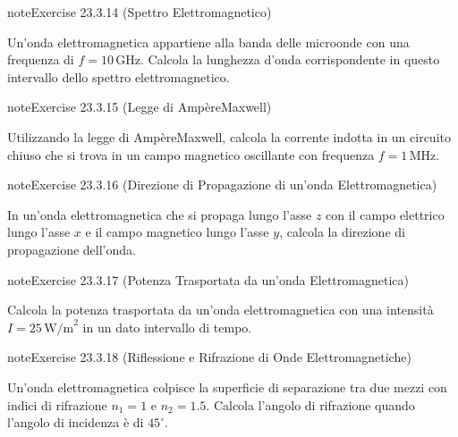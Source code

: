 \documentclass[letterpaper,10pt,italian]{jupyterBook}
\begin{document}
\begin{sphinxadmonition}{note}{Exercise 23.3.14 (Spettro Elettromagnetico)}



\sphinxAtStartPar
Un’onda elettromagnetica appartiene alla banda delle microonde con una frequenza di \(f = 10 \, \text{GHz}\). Calcola la lunghezza d’onda corrispondente in questo intervallo dello spettro elettromagnetico.
\end{sphinxadmonition}
 \label{exercise:ch/electromagnetism/em-waves-problems-exercise-14}

\begin{sphinxadmonition}{note}{Exercise 23.3.15 (Legge di Ampère\sphinxhyphen{}Maxwell)}



\sphinxAtStartPar
Utilizzando la legge di Ampère\sphinxhyphen{}Maxwell, calcola la corrente indotta in un circuito chiuso che si trova in un campo magnetico oscillante con frequenza \(f = 1 \, \text{MHz}\).
\end{sphinxadmonition}
 \label{exercise:ch/electromagnetism/em-waves-problems-exercise-15}

\begin{sphinxadmonition}{note}{Exercise 23.3.16 (Direzione di Propagazione di un’onda Elettromagnetica)}



\sphinxAtStartPar
In un’onda elettromagnetica che si propaga lungo l’asse \(z\) con il campo elettrico lungo l’asse \(x\) e il campo magnetico lungo l’asse \(y\), calcola la direzione di propagazione dell’onda.
\end{sphinxadmonition}
 \label{exercise:ch/electromagnetism/em-waves-problems-exercise-16}

\begin{sphinxadmonition}{note}{Exercise 23.3.17 (Potenza Trasportata da un’onda Elettromagnetica)}



\sphinxAtStartPar
Calcola la potenza trasportata da un’onda elettromagnetica con una intensità \(I = 25 \, \text{W/m}^2\) in un dato intervallo di tempo.
\end{sphinxadmonition}
 \label{exercise:ch/electromagnetism/em-waves-problems-exercise-17}

\begin{sphinxadmonition}{note}{Exercise 23.3.18 (Riflessione e Rifrazione di Onde Elettromagnetiche)}



\sphinxAtStartPar
Un’onda elettromagnetica colpisce la superficie di separazione tra due mezzi con indici di rifrazione \(n_1 = 1\) e \(n_2 = 1.5\). Calcola l’angolo di rifrazione quando l’angolo di incidenza è di \(45^\circ\).
\end{sphinxadmonition}
\end{document}
